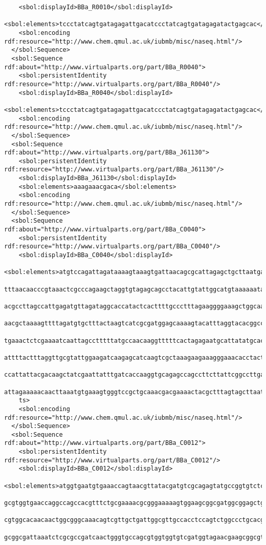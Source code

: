 \begin{lstlisting}
    <sbol:displayId>BBa_R0010</sbol:displayId>
    <sbol:elements>tccctatcagtgatagagattgacatccctatcagtgatagagatactgagcac</sbol:elements>
    <sbol:encoding rdf:resource="http://www.chem.qmul.ac.uk/iubmb/misc/naseq.html"/>
  </sbol:Sequence>
  <sbol:Sequence rdf:about="http://www.virtualparts.org/part/BBa_R0040">
    <sbol:persistentIdentity rdf:resource="http://www.virtualparts.org/part/BBa_R0040"/>
    <sbol:displayId>BBa_R0040</sbol:displayId>
    <sbol:elements>tccctatcagtgatagagattgacatccctatcagtgatagagatactgagcac</sbol:elements>
    <sbol:encoding rdf:resource="http://www.chem.qmul.ac.uk/iubmb/misc/naseq.html"/>
  </sbol:Sequence>
  <sbol:Sequence rdf:about="http://www.virtualparts.org/part/BBa_J61130">
    <sbol:persistentIdentity rdf:resource="http://www.virtualparts.org/part/BBa_J61130"/>
    <sbol:displayId>BBa_J61130</sbol:displayId>
    <sbol:elements>aaagaaacgaca</sbol:elements>
    <sbol:encoding rdf:resource="http://www.chem.qmul.ac.uk/iubmb/misc/naseq.html"/>
  </sbol:Sequence>
  <sbol:Sequence rdf:about="http://www.virtualparts.org/part/BBa_C0040">
    <sbol:persistentIdentity rdf:resource="http://www.virtualparts.org/part/BBa_C0040"/>
    <sbol:displayId>BBa_C0040</sbol:displayId>
    <sbol:elements>atgtccagattagataaaagtaaagtgattaacagcgcattagagctgcttaatgaggtcggaatcgaagg
    tttaacaacccgtaaactcgcccagaagctaggtgtagagcagcctacattgtattggcatgtaaaaaataagcgggctttgctcg
    acgccttagccattgagatgttagataggcaccatactcacttttgccctttagaaggggaaagctggcaagattttttacgtaat
    aacgctaaaagttttagatgtgctttactaagtcatcgcgatggagcaaaagtacatttaggtacacggcctacagaaaaacagta
    tgaaactctcgaaaatcaattagcctttttatgccaacaaggtttttcactagagaatgcattatatgcactcagcgctgtggggc
    attttactttaggttgcgtattggaagatcaagagcatcaagtcgctaaagaagaaagggaaacacctactactgatagtatgccg
    ccattattacgacaagctatcgaattatttgatcaccaaggtgcagagccagccttcttattcggccttgaattgatcatatgcgg
    attagaaaaacaacttaaatgtgaaagtgggtccgctgcaaacgacgaaaactacgctttagtagcttaataa</sbol:elemen
    ts>
    <sbol:encoding rdf:resource="http://www.chem.qmul.ac.uk/iubmb/misc/naseq.html"/>
  </sbol:Sequence>
  <sbol:Sequence rdf:about="http://www.virtualparts.org/part/BBa_C0012">
    <sbol:persistentIdentity rdf:resource="http://www.virtualparts.org/part/BBa_C0012"/>
    <sbol:displayId>BBa_C0012</sbol:displayId>
    <sbol:elements>atggtgaatgtgaaaccagtaacgttatacgatgtcgcagagtatgccggtgtctcttatcagaccgtttccc
    gcgtggtgaaccaggccagccacgtttctgcgaaaacgcgggaaaaagtggaagcggcgatggcggagctgaattacattcccaaccg
    cgtggcacaacaactggcgggcaaacagtcgttgctgattggcgttgccacctccagtctggccctgcacgcgccgtcgcaaattgtc
    gcggcgattaaatctcgcgccgatcaactgggtgccagcgtggtggtgtcgatggtagaacgaagcggcgtcgaagcctgtaaagcgg

\end{lstlisting}
